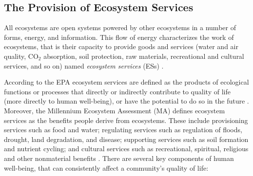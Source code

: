 \documentclass[10pt,a4paper]{article}
\begin{document}
\begin{multicols}{2}
\subsection{The Provision of Ecosystem Services}
\noindent All ecosystems are open systems powered by other ecosystems in a number of forms, energy, and information. This flow of energy characterizes the work of ecosystems, that is their capacity to provide goods and services (water and air quality, CO$_2$ absorption, soil protection, raw materials, recreational and cultural services, and so on) named \textit{ecosystem services} (ESs) \citep{r23}.

According to the EPA ecosystem services are defined as the products of ecological functions or processes that directly or indirectly contribute to quality of life (more directly to human well-being), or have the potential to do so in the future \citep{r24}. Moreover, the Millennium Ecosystem Assessment (MA) defines ecosystem services as the benefits people derive from ecosystems. These include provisioning services such as food and water; regulating services such as regulation of floods, drought, land degradation, and disease; supporting services such as soil formation and nutrient cycling; and cultural services such as recreational, spiritual, religious and other nonmaterial benefits \citep{r25}. There are several key components of human well-being, that can consistently affect a community's quality of life:


\end{multicols}
\end{document}
